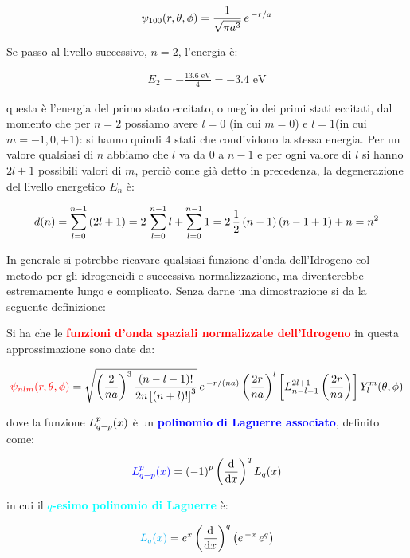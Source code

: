 \begin{align*}
	\psi_{100}\qty(r, \theta, \phi) = \frac{1}{\sqrt{\pi a^3}} \, e^{\, -r/a}
\end{align*}

	Se passo al livello successivo, $n = 2$, l'energia è:
	
\begin{align*}
	E_2 = - \frac{13.6 \,\, \text{eV}}{4} = - 3.4 \, \, \text{eV}
\end{align*}

	questa è l'energia del primo stato eccitato, o meglio dei primi stati eccitati, dal momento che per $n = 2$ possiamo avere $ l=0$ (in cui $m = 0$) e $l=1$(in cui $m=-1, 0, +1$): si hanno quindi $4$ stati che condividono la stessa energia. Per un valore qualsiasi di $n$ abbiamo che $l$ va da $0$ a $n-1$ e per ogni valore di $l$ si hanno $2l + 1$ possibili valori di $m$, perciò come già detto in precedenza, la degenerazione del livello energetico $E_n$ è:
	
\begin{align*}
	d\qty(n) = \sum_{l = 0}^{n-1} \qty(2l + 1) = 2 \, \sum_{l = 0}^{n-1} l +  \sum_{l = 0}^{n-1} 1 = 2 \, \frac{1}{2} \, \qty(n -1) \, \qty(n -1 + 1) + n = n^2
\end{align*}
	
	In generale si potrebbe ricavare qualsiasi funzione d'onda dell'Idrogeno col metodo per gli idrogeneidi e successiva normalizzazione, ma diventerebbe estremamente lungo e complicato. Senza darne una dimostrazione si da la seguente definizione:
	
\begin{mydef}
	
	Si ha che le \textcolor{red}{\textbf{funzioni d'onda spaziali normalizzate dell'Idrogeno}} in questa approssimazione sono date da:

\begin{align*}	
		\textcolor{red}{\psi_{nlm}\qty(r, \theta, \phi)} = \sqrt{   \qty( \frac{2}{na} )^3 \, \frac{\qty(n - l - 1)!}{ 2n \, \qty[\qty(n+l)!]^3}   } \, e^{ \, - r/\qty(na)} \, \qty(\frac{2r}{na})^l \, \qty[ L_{n-l-1}^{2l+1} \, \qty(\frac{2r}{na} ) ] \, Y_l^m \qty(\theta, \phi)
\end{align*}

	dove la funzione $L^p_{q-p}\qty(x)$ è un \textcolor{blue}{\textbf{polinomio di Laguerre associato}}, definito come:
	
\begin{align*}
	\textcolor{blue}{L_{q-p}^p \qty(x) }= \qty(-1)^p \, \qty(\dv{x})^q \, L_q\qty(x)
\end{align*}
	
	in cui il \textcolor{cyan}{\textbf{$q$-esimo polinomio di Laguerre}} è:

\begin{align*}
	\textcolor{cyan}{  L_q\qty(x)  } = e^x \, \qty(\dv{x})^q \, \qty(e^{\, -x} \, e^{q})
\end{align*}

\end{mydef}

